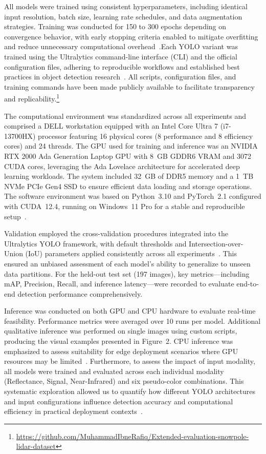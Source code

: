 \documentclass[runningheads]{llncs}
\begin{document}
All models were trained using consistent hyperparameters, including identical input resolution, batch size, learning rate schedules, and data augmentation strategies. Training was conducted for 150 to 300 epochs depending on convergence behavior, with early stopping criteria enabled to mitigate overfitting and reduce unnecessary computational overhead~\cite{goodfellow2016deep}.Each YOLO variant was trained using the Ultralytics command-line interface (CLI) and the official configuration files, adhering to reproducible workflows and established best practices in object detection research~\cite{redmon2016you}. All scripts, configuration files, and training commands have been made publicly available to facilitate transparency and replicability.\footnote{\url{https://github.com/MuhammadIbneRafiq/Extended-evaluation-snowpole-lidar-dataset}}

The computational environment was standardized across all experiments and comprised a DELL workstation equipped with an Intel Core Ultra 7 (i7-13700HX) processor featuring 16 physical cores (8 performance and 8 efficiency cores) and 24 threads. The GPU used for training and inference was an NVIDIA RTX 2000 Ada Generation Laptop GPU with 8~GB GDDR6 VRAM and 3072 CUDA cores, leveraging the Ada Lovelace architecture for accelerated deep learning workloads. The system included 32~GB of DDR5 memory and a 1~TB NVMe PCIe Gen4 SSD to ensure efficient data loading and storage operations. The software environment was based on Python~3.10 and PyTorch~2.1 configured with CUDA~12.4, running on Windows~11 Pro for a stable and reproducible setup~\cite{jegham2023comprehensive,ultralytics2024blog}.

Validation employed the cross-validation procedures integrated into the Ultralytics YOLO framework, with default thresholds and Intersection-over-Union (IoU) parameters applied consistently across all experiments~\cite{bishop2006pattern}. This ensured an unbiased assessment of each model’s ability to generalize to unseen data partitions. For the held-out test set (197 images), key metrics—including mAP, Precision, Recall, and inference latency—were recorded to evaluate end-to-end detection performance comprehensively. 

Inference was conducted on both GPU and CPU hardware to evaluate real-time feasibility. Performance metrics were averaged over 10 runs per model. Additional qualitative inference was performed on single images using custom scripts, producing the visual examples presented in Figure~2. CPU inference was emphasized to assess suitability for edge deployment scenarios where GPU resources may be limited~\cite{lane2016deepx}. Furthermore, to assess the impact of input modality, all models were trained and evaluated across each individual modality (Reflectance, Signal, Near-Infrared) and six pseudo-color combinations. This systematic exploration allowed us to quantify how different YOLO architectures and input configurations influence detection accuracy and computational efficiency in practical deployment contexts~\cite{zhang2016color}.
\end{document}
